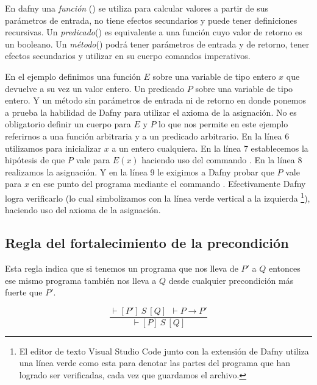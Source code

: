 \documentclass[12pt, a4paper, openany, fleqn]{book}
\newcommand{\hoareTheorem}[3]{\ensuremath{\vdash[#1]\ #2\ [#3]}}
\newcommand{\inferenceRule}[2]{
    \begin{equation*}
        \frac{#1}{#2}
    \end{equation*}
}
\begin{document}
    En dafny una \textit{función} () se utiliza para calcular valores a partir de sus parámetros de entrada, no tiene efectos secundarios y puede tener definiciones recursivas. Un \textit{predicado}() es equivalente a una función cuyo valor de retorno es un booleano. Un \textit{método}() podrá tener parámetros de entrada y de retorno, tener efectos secundarios y utilizar en su cuerpo comandos imperativos.

    En el ejemplo definimos una función $E$ sobre una variable de tipo entero $x$ que devuelve a su vez un valor entero.
    Un predicado $P$ sobre una variable de tipo entero.
    Y un método sin parámetros de entrada ni de retorno en donde ponemos a prueba la habilidad de Dafny para utilizar el axioma de la asignación.
    No es obligatorio definir un cuerpo para $E$ y $P$ lo que nos permite en este ejemplo referirnos a una función arbitraria y a un predicado arbitrario.
    En la línea 6 utilizamos  para inicializar $x$ a un entero cualquiera.
    En la línea 7 establecemos la hipótesis de que $P$ vale para $E(x)$ haciendo uso del commando .
    En la línea 8 realizamos la asignación.
    Y en la línea 9 le exigimos a Dafny probar que $P$ vale para $x$ en ese punto del programa mediante el commando .
    Efectivamente Dafny logra verificarlo (lo cual simbolizamos con la línea verde vertical a la izquierda \footnote{El editor de texto Visual Studio Code junto con la extensión de Dafny utiliza una línea verde como esta para denotar las partes del programa que han logrado ser verificadas, cada vez que guardamos el archivo.}), haciendo uso del axioma de la asignación. 
    \vspace{1em}

    \subsection{Regla del fortalecimiento de la precondición}
    Esta regla indica que si tenemos un programa que nos lleva de $P'$ a $Q$ entonces ese mismo programa también nos lleva a $Q$ desde cualquier precondición más fuerte que $P'$.
    \inferenceRule{\hoareTheorem{P'}{S}{Q}\ \ \vdash P \rightarrow P'}{\hoareTheorem{P}{S}{Q}}
\end{document}
